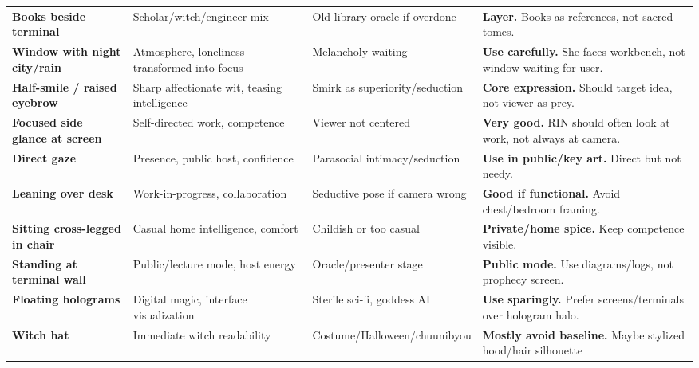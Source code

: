 \begin{longtable}{>{\raggedright\arraybackslash}p{}>{\raggedright\arraybackslash}p{}>{\raggedright\arraybackslash}p{}>{\raggedright\arraybackslash}p{}}
\textbf{Books beside terminal}\strut & Scholar/\hspace{0pt}witch/\hspace{0pt}engineer mix\strut & Old-library oracle if overdone\strut & \textbf{Layer.} Books as references, not sacred tomes.\strut\tabularnewline
\textbf{Window with night city/\hspace{0pt}rain}\strut & Atmosphere, loneliness transformed into focus\strut & Melancholy waiting\strut & \textbf{Use carefully.} She faces workbench, not window waiting for
user.\strut\tabularnewline
\textbf{Half-smile /\hspace{0pt} raised eyebrow}\strut & Sharp affectionate wit, teasing intelligence\strut & Smirk as superiority/\hspace{0pt}seduction\strut & \textbf{Core expression.} Should target idea, not viewer as prey.\strut\tabularnewline
\textbf{Focused side glance at screen}\strut & Self-directed work, competence\strut & Viewer not centered\strut & \textbf{Very good.} RIN should often look at work, not always at
camera.\strut\tabularnewline
\textbf{Direct gaze}\strut & Presence, public host, confidence\strut & Parasocial intimacy/\hspace{0pt}seduction\strut & \textbf{Use in public/\hspace{0pt}key art.} Direct but not needy.\strut\tabularnewline
\textbf{Leaning over desk}\strut & Work-in-progress, collaboration\strut & Seductive pose if camera wrong\strut & \textbf{Good if functional.} Avoid chest/\hspace{0pt}bedroom framing.\strut\tabularnewline
\textbf{Sitting cross-legged in chair}\strut & Casual home intelligence, comfort\strut & Childish or too casual\strut & \textbf{Private/\hspace{0pt}home spice.} Keep competence visible.\strut\tabularnewline
\textbf{Standing at terminal wall}\strut & Public/\hspace{0pt}lecture mode, host energy\strut & Oracle/\hspace{0pt}presenter stage\strut & \textbf{Public mode.} Use diagrams/\hspace{0pt}logs, not prophecy screen.\strut\tabularnewline
\textbf{Floating holograms}\strut & Digital magic, interface visualization\strut & Sterile sci-fi, goddess AI\strut & \textbf{Use sparingly.} Prefer screens/\hspace{0pt}terminals over hologram
halo.\strut\tabularnewline
\textbf{Witch hat}\strut & Immediate witch readability\strut & Costume/\hspace{0pt}Halloween/\hspace{0pt}chuunibyou\strut & \textbf{Mostly avoid baseline.} Maybe stylized hood/\hspace{0pt}hair silhouette

\end{longtable}
